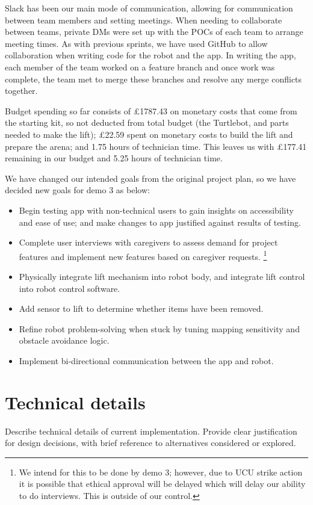 \documentclass{article}
\begin{document}
Slack has been our main mode of communication, allowing for communication between team members and setting meetings. When needing to collaborate between teams, private DMs were set up with the POCs of each team to arrange meeting times. As with previous sprints, we have used GitHub to allow collaboration when writing code for the robot and the app. In writing the app, each member of the team worked on a feature branch and once work was complete, the team met to merge these branches and resolve any merge conflicts together. 

Budget spending so far consists of \pounds 1787.43 on monetary costs that come from the starting kit, so not deducted from total budget (the Turtlebot, and parts needed to make the lift); \pounds 22.59 spent on monetary costs to build the lift and prepare the arena; and 1.75 hours of technician time. This leaves us with \pounds 177.41 remaining in our budget and 5.25 hours of technician time. 

We have changed our intended goals from the original project plan, so we have decided new goals for demo 3 as below:
\begin{itemize}
\item Begin testing app with non-technical users to gain insights on accessibility and ease of use; and make changes to app justified against results of testing.
\item Complete user interviews with caregivers to assess demand for project features and implement new features based on caregiver requests. \footnote{We intend for this to be done by demo 3; however, due to UCU strike action it is possible that ethical approval will be delayed which will delay our ability to do interviews. This is outside of our control.}
\item Physically integrate lift mechanism into robot body, and integrate lift control into robot control software.
\item Add sensor to lift to determine whether items have been removed. 
\item Refine robot problem-solving when stuck by tuning mapping sensitivity and obstacle avoidance logic.
\item Implement bi-directional communication between the app and robot.
\end{itemize}

\section{Technical details}
Describe technical details of current implementation. Provide clear justification for design decisions, with brief reference to alternatives considered or explored.
\end{document}
